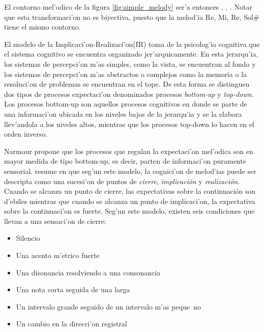 \begin{imagen}
    \width{11cm}
\end{imagen}

El contorno mel'odico de la figura \ref{fig:simple_melody} ser'a entonces , , .
Notar que esta transformaci'on no es biyectiva, puesto que la melod'ia Re, Mi, Re, Sol\# tiene el mismo contorno.

El modelo de la Implicaci'on-Realizaci'on(IR) toma de la psicolog'ia cognitiva que el sistema cognitivo se encuentra organizado jer'arquicamente. En esta jerarqu'ia, los sistemas 
de percepci'on m'as simples, como la vista, se encuentran al fondo y los sistemas de percepci'on m'as abstractos o complejos como la memoria o la 
resoluci'on de problemas se encuentran en el tope. De esta forma se distinguen dos tipos de procesos expectaci'on denominados procesos \emph{bottom-up} 
y \emph{top-down}. Los procesos bottom-up son aquellos procesos cognitivos en donde se parte de una informaci'on ubicada en los niveles bajos de la jerarqu'ia y se la 
elabora llev'andola a los niveles altos, mientras que los procesos top-down lo hacen en el orden inverso. 

Narmour propone que los procesos que regulan la expectaci'on mel'odica son en mayor medida de tipo bottom-up, es decir, parten de informaci'on puramente sensorial. 
\cite{Krumhansl95} resume en  que seg'un este modelo, la cognici'on de melod'ias puede ser descripta como una sucesi'on de puntos 
de \emph{cierre}, \emph{implicaci\'on} y \emph{realizaci\'on}. Cuando se alcanza un punto de cierre, las expectativas sobre la continuaci\'on 
son d'ebiles mientras que cuando se alcanza un punto de implicaci'on, la expectativa sobre la continuaci'on es fuerte. Seg'un este modelo,
existen seis condiciones que llevan a una sensaci'on de cierre:
\begin{itemize}
 \item Silencio
 \item Una acento m'etrico fuerte
 \item Una disonancia resolviendo a una consonancia
 \item Una nota corta seguida de una larga
 \item Un intervalo grande seguido de un intervalo m'as peque~no
 \item Un cambio en la direcci'on registral
\end{itemize}

